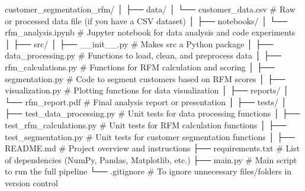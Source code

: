 customer_segmentation_rfm/
│
├── data/
│   └── customer_data.csv         # Raw or processed data file (if you have a CSV dataset)
│
├── notebooks/
│   └── rfm_analysis.ipynb        # Jupyter notebook for data analysis and code experiments
│
├── src/
│   ├── __init__.py               # Makes src a Python package
│   ├── data_processing.py        # Functions to load, clean, and preprocess data
│   ├── rfm_calculations.py       # Functions for RFM calculation and scoring
│   ├── segmentation.py           # Code to segment customers based on RFM scores
│   ├── visualization.py          # Plotting functions for data visualization
│
├── reports/
│   └── rfm_report.pdf            # Final analysis report or presentation
│
├── tests/
│   ├── test_data_processing.py   # Unit tests for data processing functions
│   ├── test_rfm_calculations.py  # Unit tests for RFM calculation functions
│   ├── test_segmentation.py      # Unit tests for customer segmentation functions
│
├── README.md                     # Project overview and instructions
├── requirements.txt              # List of dependencies (NumPy, Pandas, Matplotlib, etc.)
├── main.py                       # Main script to run the full pipeline
└── .gitignore                    # To ignore unnecessary files/folders in version control
